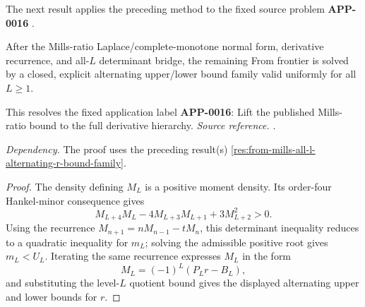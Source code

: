 The next result applies the preceding method to the fixed source problem \textbf{APP-0016} \cite{from-mills}.
\begin{corollary}
\label{res:from-mills-explicit-bound-family-frontier}
After the Mills-ratio Laplace/complete-monotone normal form, derivative recurrence, and all-\(L\) determinant bridge, the remaining From frontier is solved by a closed, explicit alternating upper/lower bound family valid uniformly for all \(L\ge1\).

This resolves the fixed application label \textbf{APP-0016}: Lift the published Mills-ratio bound to the full derivative hierarchy.
\emph{Source reference.} \cite{from-mills}.

\emph{Dependency.} The proof uses the preceding result(s) \ref{res:from-mills-all-l-alternating-r-bound-family}.
\end{corollary}
\begin{proof}
The density defining \(M_L\) is a positive moment density.  Its order-four
Hankel-minor consequence gives
\[
M_{L+4}M_L-4M_{L+3}M_{L+1}+3M_{L+2}^2>0.
\]
Using the recurrence \(M_{n+1}=nM_{n-1}-tM_n\), this determinant inequality
reduces to a quadratic inequality for \(m_L\); solving the admissible positive
root gives \(m_L<U_L\).  Iterating the same recurrence expresses \(M_L\) in the
form
\[
M_L=(-1)^L(P_L r-B_L),
\]
and substituting the level-\(L\) quotient bound gives the displayed alternating
upper and lower bounds for \(r\).
\end{proof}
